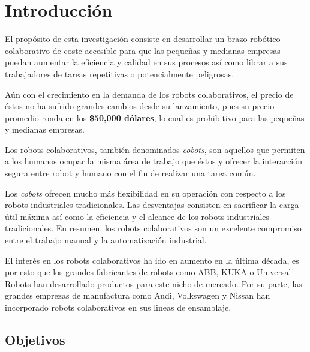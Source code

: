 \chapter{Introducción}

El propósito de esta investigación consiste en desarrollar un brazo robótico colaborativo de coste accesible para que las pequeñas y medianas empresas puedan aumentar la eficiencia y calidad en sus procesos así como librar a sus trabajadores de tareas repetitivas o potencialmente peligrosas. %

Aún con el crecimiento en la demanda de los robots colaborativos, el precio de éstos no ha sufrido grandes cambios desde su lanzamiento, pues su precio promedio ronda en los \textbf{\$50,000 dólares}, lo cual es prohibitivo para las pequeñas y medianas empresas. %

Los robots colaborativos, también denominados \textit{cobots}, son aquellos que permiten a los humanos ocupar la misma área de trabajo que éstos y ofrecer la interacción segura entre robot y humano con el fin de realizar una tarea común.  %

Los \textit{cobots} ofrecen mucho más flexibilidad en su operación con respecto a los robots industriales tradicionales. Las desventajas consisten en sacrificar la carga útil máxima así como la  eficiencia y el alcance de los robots industriales tradicionales. En resumen, los robots colaborativos son un excelente compromiso entre el trabajo manual y la automatización industrial. \cite{Zaatari2019} %

El interés en los robots colaborativos ha ido en aumento en la última década, es por esto que los grandes fabricantes de robots como ABB, KUKA o Universal Robots han desarrollado productos para este nicho de mercado. Por su parte, las grandes emprezas de manufactura como Audi, Volkswagen y Nissan han incorporado robots colaborativos en sus lineas de ensamblaje. \cite{Zaatari2019} %

\begin{comment}
Párrafo uno: Introducción sobre los robots colaborativos
Párrafo dos: Ventajas con respecto a robots tradicionales
Párrafo tres: Pertinencia de la investigación en la actualidad
Párrafo cuatro: Propósito de la investigación.
Párrafo cinco: Propósito de la investigación e interés social.
\end{comment}


\section{Objetivos}


